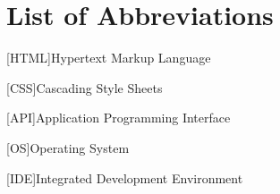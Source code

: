 \section{List of Abbreviations}
\label{sec:list-of-abbreviations}

\begin{acronym}
    [HTML]{Hypertext Markup Language}
\end{acronym}

\begin{acronym}
    [CSS]{Cascading Style Sheets}
\end{acronym}

\begin{acronym}
    [API]{Application Programming Interface}
\end{acronym}

\begin{acronym}
    [OS]{Operating System}
\end{acronym}

\begin{acronym}
    [IDE]{Integrated Development Environment}
\end{acronym}

